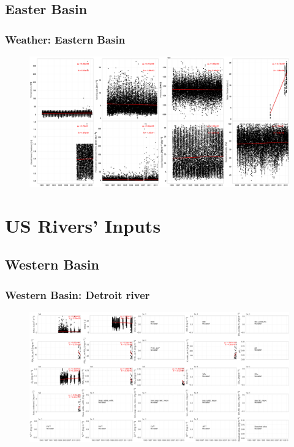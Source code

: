 \documentclass{beamer}
\begin{document}
\subsection{Easter Basin}
\label{sub:wes}

\begin{frame}
\frametitle{Weather: Eastern Basin}
\begin{figure}
\includegraphics[width=\textwidth]{weather/eastern basin weather.png}
\end{figure}
\end{frame}

\section{US Rivers' Inputs}
\label{sec:river_inputs}

\subsection{Western Basin}
\label{sub:western_basin}

\begin{frame}
\frametitle{Western Basin: Detroit river}
\begin{figure}
\includegraphics[width=\textwidth]{rivers/Western basin/plot_all detroitriver.png}
\end{figure}
\end{frame}
\end{document}
